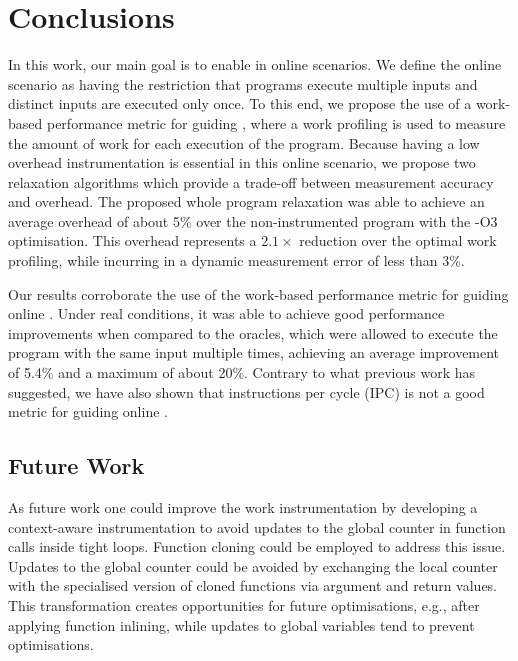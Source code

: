 \chapter{Conclusions}\label{chap:conclusion}

In this work, our main goal is to enable {\itercomp} in online scenarios.
We define the online scenario as having the restriction that programs execute multiple inputs and distinct inputs are executed only once.
To this end, we propose the use of a work-based performance metric for guiding {\itercomp},
where a work profiling is used to measure the amount of work for each execution of the program.
Because having a low overhead instrumentation is essential in this online scenario, we propose two relaxation algorithms which provide a trade-off between measurement accuracy and overhead.
The proposed whole program relaxation was able to achieve an average overhead of about 5\% over the non-instrumented program with the {\flagstype -O3} optimisation.
This overhead represents a $2.1\times$ reduction over the optimal work profiling, while incurring in a dynamic measurement error of less than 3\%.

Our results corroborate the use of the work-based performance metric for guiding online {\itercomp}.
Under real conditions, it was able to achieve good performance improvements when compared to the oracles, which were allowed to execute the program with the same input multiple times,
achieving an average improvement of 5.4\% and a maximum of about 20\%.
Contrary to what previous work has suggested, we have also shown that instructions per cycle (IPC) is not a good metric for guiding online {\itercomp}.

\section{Future Work}

As future work one could improve the work instrumentation by developing a context-aware instrumentation to avoid updates to the global counter in function calls inside tight loops.
Function cloning could be employed to address this issue.
Updates to the global counter could be avoided by exchanging the local counter with the specialised version of cloned functions via argument and return values.
This transformation creates opportunities for future optimisations, e.g., after applying function inlining, while updates to global variables tend to prevent optimisations.

